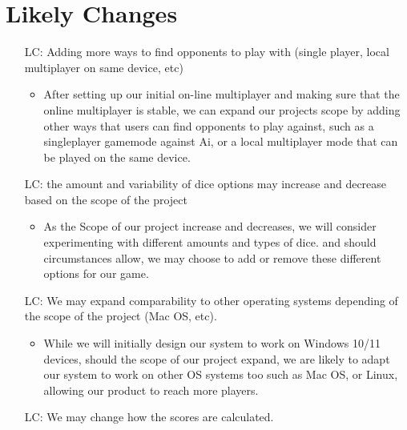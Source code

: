 \section{Likely Changes}    

\noindent \begin{itemize}

\item[LC\refstepcounter{lcnum}\thelcnum \label{LC_find_opp}:] Adding more ways to find opponents to play with (single player, local multiplayer on same device, etc)

\begin{itemize}
	\item After setting up our initial on-line multiplayer and making sure that the online multiplayer is stable, we can expand our projects scope by adding other ways that users can find opponents to play against, such as a singleplayer gamemode against Ai, or a local multiplayer mode that can be played on the same device.
\end{itemize}

\item[LC\refstepcounter{lcnum}\thelcnum \label{LC_dice}:] the amount and variability of dice options may increase and decrease based on the scope of the project

\begin{itemize}
	\item As the Scope of our project increase and decreases, we will consider experimenting with different amounts and types of dice. and should circumstances allow, we may choose to add or remove these different options for our game.
\end{itemize}

\item[LC\refstepcounter{lcnum}\thelcnum \label{LC_platforms}:] We may expand comparability to other operating systems depending of the scope of the project (Mac OS, etc).

\begin{itemize}
	\item While we will initially design our system to work on Windows 10/11 devices, should the scope of our project expand, we are likely to adapt our system to work on other OS systems too such as Mac OS, or Linux, allowing our product to reach more players.
\end{itemize}

\item[LC\refstepcounter{lcnum}\thelcnum \label{LC_score_calc}:] We may change how the scores are calculated.


\end{itemize}
